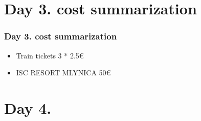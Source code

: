 \documentclass{beamer}
\begin{document}
	\section{Day 3. cost summarization}
	\begin{frame}
		\frametitle{Day 3. cost summarization}

		\begin{itemize}
			\item Train tickets 3 * 2.5€
			\item ISC RESORT MLYNICA 50€
		\end{itemize}
	\end{frame}

	\section{Day 4.}
\end{document}
